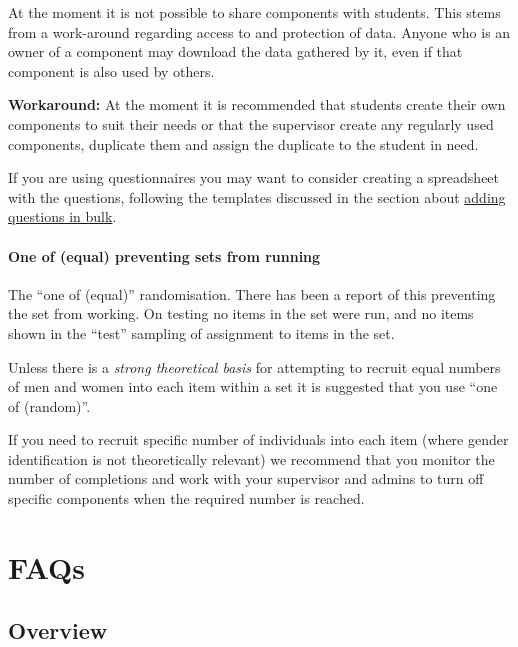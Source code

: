 \documentclass[]{book}
\begin{document}
At the moment it is not possible to share components with students. This
stems from a work-around regarding access to and protection of data.
Anyone who is an owner of a component may download the data gathered by
it, even if that component is also used by others.

\begin{workaround}
\textbf{Workaround:} At the moment it is recommended that students
create their own components to suit their needs or that the supervisor
create any regularly used components, duplicate them and assign the
duplicate to the student in need.

If you are using questionnaires you may want to consider creating a
spreadsheet with the questions, following the templates discussed in the
section about \protect\hyperlink{addfromspreadsheet}{adding questions in
bulk}.
\end{workaround}

\subsubsection*{One of (equal) preventing sets from
running}\label{oneofequal}

The ``one of (equal)'' randomisation. There has been a report of this
preventing the set from working. On testing no items in the set were
run, and no items shown in the ``test'' sampling of assignment to items
in the set.

\begin{workaround}
Unless there is a \emph{strong theoretical basis} for attempting to
recruit equal numbers of men and women into each item within a set it is
suggested that you use ``one of (random)''.

If you need to recruit specific number of individuals into each item
(where gender identification is not theoretically relevant) we recommend
that you monitor the number of completions and work with your supervisor
and admins to turn off specific components when the required number is
reached.
\end{workaround}

\chapter*{FAQs}\label{faqs}

\section*{Overview}\label{overview-8}
\end{document}
